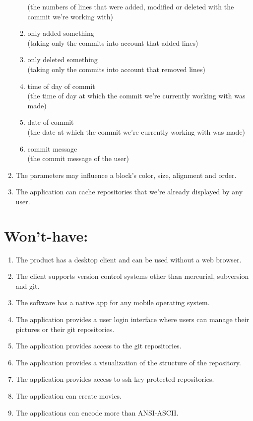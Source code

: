 \documentclass[12pt]{scrartcl}
\begin{document}
\begin{enumerate}
\begin{enumerate}
(the numbers of lines that were added, modified or deleted with the commit we're working with)
\item only added something \\
(taking only the commits into account that added lines)
\item only deleted something\\
(taking only the commits into account that removed lines)
\item time of day of commit\\
(the time of day at which the commit we're currently working with was made)
\item date of commit\\
(the date at which the commit we're currently working with was made)
\item commit message\\
(the commit message of the user)
\end{enumerate}
\item The parameters may influence a block's color, size, alignment and order.
\item The application can cache repositories that we're already displayed by any user.
\end{enumerate}
\section{Won't-have:}
\begin{enumerate}
\item The product has a desktop client and can be used without a web browser.
\item The client supports version control systems other than mercurial, subversion and git.
\item The software has a native app for any mobile operating system.
\item The application provides a user login interface where users can manage their pictures or their git repositories.
\item The application provides access to the git repositories.
\item The application provides a visualization of the structure of the repository.
\item The application provides access to ssh key protected repositories.
\item The application can create movies.
\item The applications can encode more than ANSI-ASCII.
\end{enumerate}
\end{document}
